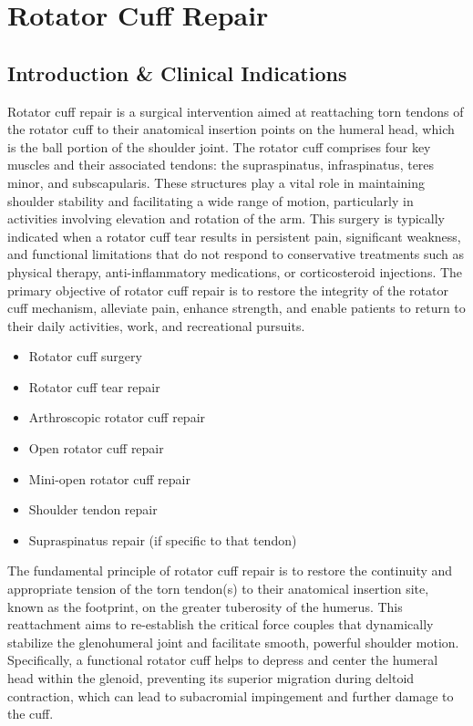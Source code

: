 \chapter{Rotator Cuff Repair}

\section*{Introduction \& Clinical Indications}
Rotator cuff repair is a surgical intervention aimed at reattaching torn tendons of the rotator cuff to their anatomical insertion points on the humeral head, which is the ball portion of the shoulder joint. The rotator cuff comprises four key muscles and their associated tendons: the supraspinatus, infraspinatus, teres minor, and subscapularis. These structures play a vital role in maintaining shoulder stability and facilitating a wide range of motion, particularly in activities involving elevation and rotation of the arm. This surgery is typically indicated when a rotator cuff tear results in persistent pain, significant weakness, and functional limitations that do not respond to conservative treatments such as physical therapy, anti-inflammatory medications, or corticosteroid injections. The primary objective of rotator cuff repair is to restore the integrity of the rotator cuff mechanism, alleviate pain, enhance strength, and enable patients to return to their daily activities, work, and recreational pursuits.

\begin{itemize}
  \item Rotator cuff surgery
  \item Rotator cuff tear repair
  \item Arthroscopic rotator cuff repair
  \item Open rotator cuff repair
  \item Mini-open rotator cuff repair
  \item Shoulder tendon repair
  \item Supraspinatus repair (if specific to that tendon)
\end{itemize}

The fundamental principle of rotator cuff repair is to restore the continuity and appropriate tension of the torn tendon(s) to their anatomical insertion site, known as the footprint, on the greater tuberosity of the humerus. This reattachment aims to re-establish the critical force couples that dynamically stabilize the glenohumeral joint and facilitate smooth, powerful shoulder motion. Specifically, a functional rotator cuff helps to depress and center the humeral head within the glenoid, preventing its superior migration during deltoid contraction, which can lead to subacromial impingement and further damage to the cuff.

